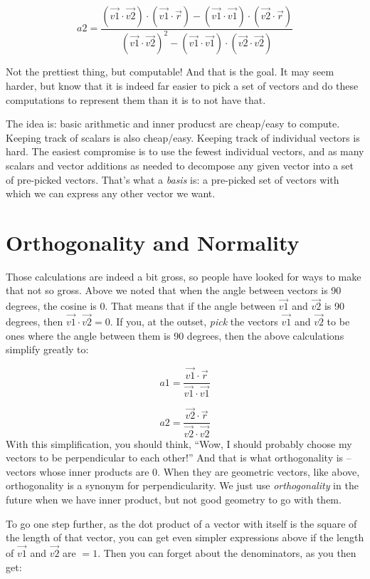 \documentclass[
]{book}
\begin{document}
\[a2 = \frac{(\vec{v1}\cdot\vec{v2})\cdot(\vec{v1}\cdot\vec{r})-(\vec{v1}\cdot\vec{v1})\cdot(\vec{v2}\cdot\vec{r})}{(\vec{v1}\cdot\vec{v2})^2 - (\vec{v1}\cdot\vec{v1})\cdot(\vec{v2}\cdot\vec{v2})}\]

Not the prettiest thing, but computable! And that is the goal. It may seem harder, but know that it is indeed far easier to pick a set of vectors and do these computations to represent them than it is to not have that.

The idea is: basic arithmetic and inner producst are cheap/easy to compute. Keeping track of scalars is also cheap/easy. Keeping track of individual vectors is hard. The easiest compromise is to use the fewest individual vectors, and as many scalars and vector additions as needed to decompose any given vector into a set of pre-picked vectors. That's what a \emph{basis} is: a pre-picked set of vectors with which we can express any other vector we want.

\hypertarget{orthogonality-and-normality}{%
\section{Orthogonality and Normality}\label{orthogonality-and-normality}}

Those calculations are indeed a bit gross, so people have looked for ways to make that not so gross. Above we noted that when the angle between vectors is 90 degrees, the cosine is 0. That means that if the angle between \(\vec{v1}\) and \(\vec{v2}\) is 90 degrees, then \(\vec{v1}\cdot\vec{v2} = 0\). If you, at the outset, \emph{pick} the vectors \(\vec{v1}\) and \(\vec{v2}\) to be ones where the angle between them is 90 degrees, then the above calculations simplify greatly to:

\[a1 = \frac{\vec{v1}\cdot\vec{r}}{\vec{v1}\cdot\vec{v1}}\]

\[a2 = \frac{\vec{v2}\cdot\vec{r}}{\vec{v2}\cdot\vec{v2}}\]
With this simplification, you should think, ``Wow, I should probably choose my vectors to be perpendicular to each other!'' And that is what orthogonality is -- vectors whose inner products are 0. When they are geometric vectors, like above, orthogonality is a synonym for perpendicularity. We just use \emph{orthogonality} in the future when we have inner product, but not good geometry to go with them.

To go one step further, as the dot product of a vector with itself is the square of the length of that vector, you can get even simpler expressions above if the length of \(\vec{v1}\) and \(\vec{v2}\) are \(= 1\). Then you can forget about the denominators, as you then get:
\end{document}
